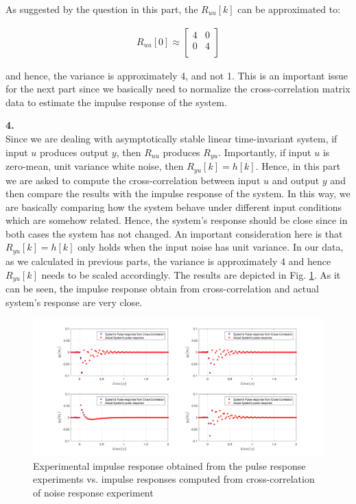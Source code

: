 \documentclass[paper=US leter, fontsize=11pt]{scrartcl}
\begin{document}
As suggested by the question in this part, the $R_{uu}[k]$ can be approximated to:

\begin{gather*}
R_{uu}[0] \approx \begin{bmatrix}
4 & 0 \\
0 & 4 \\
\end{bmatrix} \tag{8}
\end{gather*}

and hence, the variance is approximately 4, and not 1. This is an important issue for the next part since we basically need to normalize the cross-correlation matrix data to estimate the impulse response of the system.

\vspace{20pt}
\textbf{4.}\\
Since we are dealing with asymptotically stable linear time-invariant system, if input $u$ produces output $y$, then $R_{uu}$ produces $R_{yu}$. Importantly, if input $u$ is zero-mean, unit variance white noise, then $R_{yu}[k] = h[k]$. Hence, in this part we are asked to compute the cross-correlation between input $u$ and output $y$ and then compare the results with the impulse response of the system. In this way, we are basically comparing how the system behave under different input conditions which are somehow related. Hence, the system's response should be close since in both cases the system has not changed. 
An important consideration here is that $R_{yu}[k] = h[k]$ only holds when the input noise has unit variance. In our data, as we calculated in previous parts, the variance is approximately 4 and hence $R_{yu}[k]$ needs to be scaled accordingly. The results are depicted in Fig. \ref{task34}. As it can be seen, the impulse response obtain from cross-correlation and actual system's response are very close.

\begin{figure}[t!]  
	\centering    
	\includegraphics[scale=0.38,trim={4.5cm 0 0 0},clip]{task34.png}  
	\caption{Experimental impulse response obtained from
		the pulse response experiments vs. impulse responses computed from cross-correlation of noise response experiment}
	\label{task34} 
\end{figure} 
\end{document}
